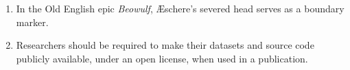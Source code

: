 \documentclass[twoside,openright,11pt]{book}
\begin{document}
\begin{adjustwidth}{-1.25em}{-0.25em}
\begin{enumerate}
\item In the Old English epic \textit{Beowulf}, Æschere's severed head serves as a boundary marker.%

\item Researchers should be required to make their datasets and source code publicly available, under an open license, when used in a publication.


\end{enumerate}
\end{adjustwidth}
\end{document}
